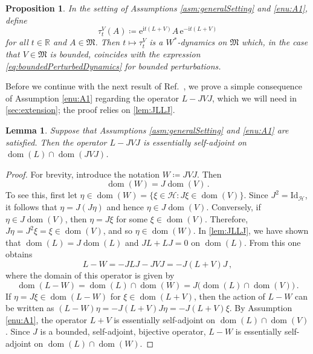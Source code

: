 \documentclass[a4paper, twoside, 11pt, reqno]{amsart}
\theoremstyle{definition}
\theoremstyle{plain}
\newtheorem{proposition}[definition]{Proposition}
\newtheorem{lemma}[definition]{Lemma}
\newcommand{\R}{\mathbb{R}}
\newcommand{\MH}{\mathcal{H}}
\newcommand{\MFM}{\mathfrak{M}}
\newcommand{\ii}{\mathrm{i}}
\newcommand{\ee}{\mathrm{e}}
\newcommand{\id}{\mathrm{Id}}
\newcommand{\1}{\mathbf{1}}
\DeclareMathOperator{\dom}{dom}
\newcommand{\set}[2][]{#1\{{#2}#1\}}
\newcommand{\ce}{\coloneqq}
\begin{document}
\begin{proposition}\label{pro:unboundedPerturbedDynamics}
    In the setting of Assumptions \ref{asm:generalSetting} and \ref{enu:A1}, define
    \begin{equation}\label{eq:unboundedPerturbedDynamics}
        \tau_t^V(A) \ce \ee^{\ii t (L + V)} A \, \ee^{- \ii t (L + V)}
    \end{equation}
    for all $t \in \R$ and $A \in \MFM$. Then $t \mapsto \tau_t^V$ is a $W^\ast$-dynamics on $\MFM$ which, in the case that $V \in \MFM$ is bounded, coincides with the expression \eqref{eq:boundedPerturbedDynamics} for bounded perturbations.
\end{proposition}

Before we continue with the next result of Ref.~\cite{DJP03}, we prove a simple consequence of Assumption \ref{enu:A1} regarding the operator $L - J V J$, which we will need in \cref{sec:extension}; the proof relies on \cref{lem:JLLJ}.

\begin{lemma}\label{lem:LJVJessSA}
    Suppose that Assumptions \ref{asm:generalSetting} and \ref{enu:A1} are satisfied. Then the operator $L - J V J$ is essentially self-adjoint on $\dom(L) \cap \dom(J V J)$.
\end{lemma}

\begin{proof}
    For brevity, introduce the notation $W \ce J V J$. Then
    \begin{equation*}
        \dom(W) = J \dom(V) \, .
    \end{equation*}
    To see this, first let $\eta \in \dom(W) = \set{\xi \in \MH : J \xi \in \dom(V)}$. Since $J^2 = \id_\MH$, it follows that $\eta = J (J \eta)$ and hence $\eta \in J \dom(V)$. Conversely, if $\eta \in J \dom(V)$, then $\eta = J \xi$ for some $\xi \in \dom(V)$. Therefore, $J \eta = J^2 \xi = \xi \in \dom(V)$, and so $\eta \in \dom(W)$. In \cref{lem:JLLJ}, we have shown that $\dom(L) = J \dom(L)$ and $J L + L J = 0$ on $\dom(L)$. From this one obtains
    \begin{equation*}
        L - W = - J L J - J V J = - J (L + V) J \, ,
    \end{equation*}
    where the domain of this operator is given by
    \begin{equation*}
        \dom(L - W) = \dom(L) \cap \dom(W) = J \bigl(\dom(L) \cap \dom(V)\bigr) \, .
    \end{equation*}
    If $\eta = J \xi \in \dom(L - W)$ for $\xi \in \dom(L + V)$, then the action of $L - W$ can be written as $(L - W) \eta = - J (L + V) J \eta = - J (L + V) \xi$. By Assumption \ref{enu:A1}, the operator $L + V$ is essentially self-adjoint on $\dom(L) \cap \dom(V)$. Since $J$ is a bounded, self-adjoint, bijective operator, $L - W$ is essentially self-adjoint on $\dom(L) \cap \dom(W)$.
\end{proof}
\end{document}
